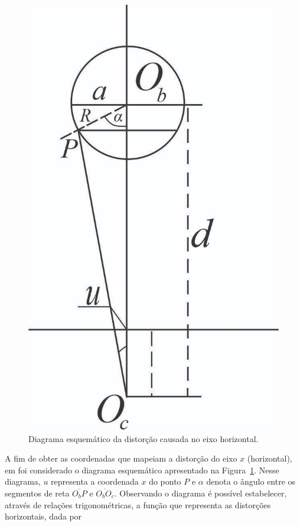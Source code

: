 \begin{figure}[ht]
    \caption{Diagrama esquemático da distorção causada no eixo horizontal.}
    \centering
    \vspace{0.4cm}
    \begin{minipage}{.3\textwidth}
         \includegraphics[width=\textwidth]{TCC/Imagens/dist_horz_2.jpeg}
	\end{minipage}
    \label{fig:dist_horz}
\end{figure}


A fim de obter as coordenadas que mapeiam a distorção do eixo $x$ (horizontal), em \cite{Lin:2013} foi considerado o diagrama esquemático apresentado na Figura~\ref{fig:dist_horz}. Nesse diagrama, $u$ representa a coordenada $x$ do ponto $P$ e $\alpha$ denota o ângulo entre os segmentos de reta   $\overline{O_{b}P}$ e $\overline{O_{b}O_{c}}$.  Observando o diagrama é possível estabelecer, através de relações trigonométricas, a função que representa as distorções horizontais, dada por

